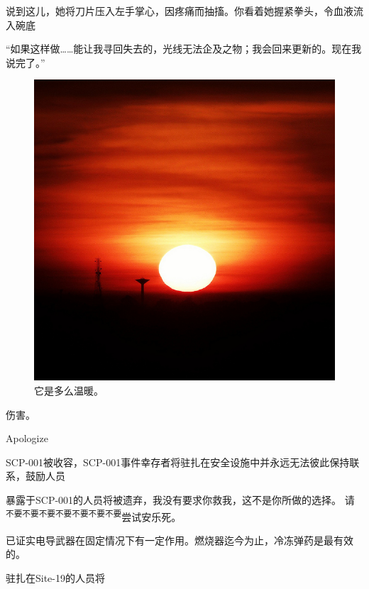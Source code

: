\begin{scpbox}
说到这儿，她将刀片压入左手掌心，因疼痛而抽搐。你看着她握紧拳头，令血液流入碗底
\end{scpbox}

\begin{scpdialog}
“如果这样做……能让我寻回失去的，光线无法企及之物；我会回来更新的。现在我说完了。”
\end{scpdialog}

\hr


\newpage



\hr


\begin{figure}[H]
	\centering
	\includegraphics[width=0.5\linewidth]{images/SCP.001.when.night.breaks.2.jpg}
	\caption*{它是多么温暖。}
\end{figure}

伤害。

Apologize

SCP-001被收容，SCP-001事件幸存者将驻扎在安全设施中并永远无法彼此保持联系，鼓励人员


暴露于SCP-001的人员将被遗弃，我没有要求你救我，这不是你所做的选择。 请\textsuperscript{
不要不要不要不要不要不要不要}尝试安乐死。

已证实电导武器在固定情况下有一定作用。燃烧器迄今为止，冷冻弹药是最有效的。

驻扎在Site-19的人员将

